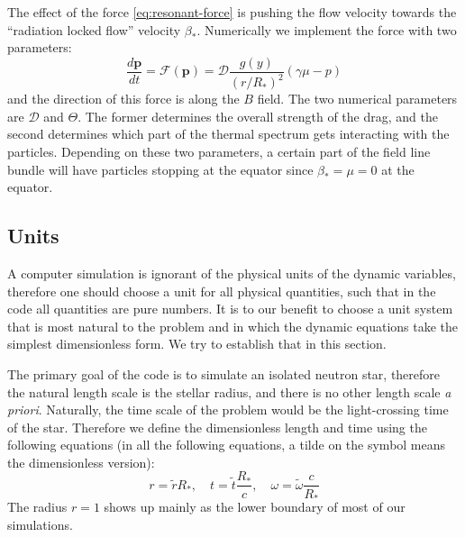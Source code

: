 The effect of the force \eqref{eq:resonant-force} is pushing the flow velocity
towards the ``radiation locked flow'' velocity $\beta_{*}$. Numerically we
implement the force with two parameters:
\begin{equation}
  \label{eq:resonant-drag-numerical}
  \frac{d\mathbf{p}}{dt} = \mathcal{F}(\mathbf{p}) = \mathcal{D}\frac{g(y)}{(r/R_{*})^2}(\gamma\mu - p)
\end{equation}
and the direction of this force is along the $B$ field. The two numerical
parameters are $\mathcal{D}$ and $\Theta$. The former determines the overall
strength of the drag, and the second determines which part of the thermal
spectrum gets interacting with the particles. Depending on these two parameters,
a certain part of the field line bundle will have particles stopping at the
equator since $\beta_{*} = \mu = 0$ at the equator.



\subsection{Units}
\label{sec:pic-units}

A computer simulation is ignorant of the physical units of the dynamic
variables, therefore one should choose a unit for all physical quantities, such
that in the code all quantities are pure numbers. It is to our benefit to choose
a unit system that is most natural to the problem and in which the dynamic
equations take the simplest dimensionless form. We try to establish that in this
section.

The primary goal of the code is to simulate an isolated neutron star, therefore
the natural length scale is the stellar radius, and there is no other length
scale {\it a priori}. Naturally, the time scale of the problem would be the
light-crossing time of the star. Therefore we define the dimensionless length
and time using the following equations (in all the following equations, a tilde
on the symbol means the dimensionless version):
\begin{equation}
  r = \tilde{r}R_{*},\quad t = \tilde{t}\frac{R_{*}}{c},\quad \omega = \tilde{\omega}\frac{c}{R_{*}}
\end{equation}
The radius $r = 1$ shows up mainly as the lower boundary of most of our
simulations.

